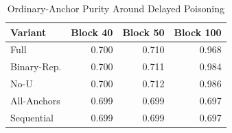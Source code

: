 \begin{table}[!t]
\centering
\caption{Ordinary-Anchor Purity Around Delayed Poisoning}
\label{tab:rq3-feedback}
\scriptsize
\setlength{\tabcolsep}{4.1pt}
\renewcommand{\arraystretch}{1.08}
\begin{tabular}{lrrr}
\toprule
Variant & Block 40 & Block 50 & Block 100 \\
\midrule
Full & 0.700 & 0.710 & 0.968 \\
Binary-Rep. & 0.700 & 0.711 & 0.984 \\
No-U & 0.700 & 0.712 & 0.986 \\
All-Anchors & 0.699 & 0.699 & 0.697 \\
Sequential & 0.699 & 0.699 & 0.697 \\
\bottomrule
\end{tabular}
\end{table}
